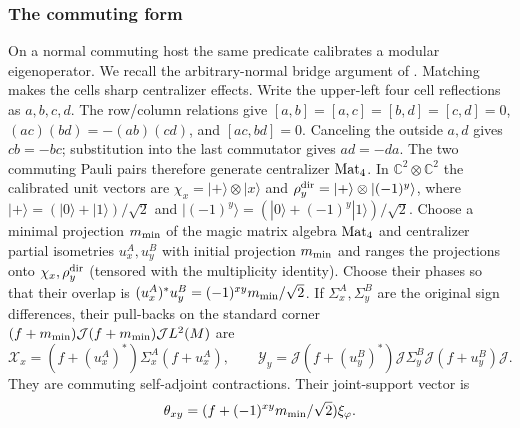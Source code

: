 \subsubsection{The commuting form}\label{sec:bridgecomm}
On a normal commuting host the same predicate calibrates a modular eigenoperator. We recall the arbitrary-normal bridge argument of \cite[Lemma 2.2]{ReadType}. Matching makes the cells sharp centralizer effects. Write the upper-left four cell reflections as $a,b,c,d$. The row/column relations give $[a,b]=[a,c]=[b,d]=[c,d]=0$, $(ac)(bd)=-(ab)(cd)$, and $[ac,bd]=0$. Canceling the outside $a,d$ gives $cb=-bc$; substitution into the last commutator gives $ad=-da$. The two commuting Pauli pairs therefore generate centralizer $\mathrm{Mat}_4$. In $\mathbb C^2\otimes\mathbb C^2$ the calibrated unit vectors are $\chi_x=|+\rangle\otimes|x\rangle$ and $\rho_y^{\rm dir}=|+\rangle\otimes|(-1)^y\rangle$, where $|+\rangle=(|0\rangle+|1\rangle)/\sqrt2$ and $|(-1)^y\rangle=(|0\rangle+(-1)^y|1\rangle)/\sqrt2$. Choose a minimal projection $m_{\rm min}$ of the magic matrix algebra $\mathrm{Mat}_4$ and centralizer partial isometries $u^A_x,u^B_y$ with initial projection $m_{\rm min}$ and ranges the projections onto $\chi_x,\rho_y^{\rm dir}$ (tensored with the multiplicity identity). Choose their phases so that their overlap is $(u^A_x)^*u^B_y=(-1)^{xy}m_{\rm min}/\sqrt2$. If $\Sigma_x^A,\Sigma_y^B$ are the original sign differences, their pull-backs on the standard corner $(f+m_{\rm min})\mathcal J(f+m_{\rm min})\mathcal J L^2(M)$ are
\[
 \mathcal X_x=(f+(u^A_x)^*)\Sigma_x^A(f+u^A_x),\qquad
 \mathcal Y_y=\mathcal J(f+(u^B_y)^*)\mathcal J\Sigma_y^B \mathcal J(f+u^B_y)\mathcal J.
\]
They are commuting self-adjoint contractions. Their joint-support vector is
\[
 \theta_{xy}=(f+(-1)^{xy}m_{\rm min}/\sqrt2)\xi_\varphi .
\]
